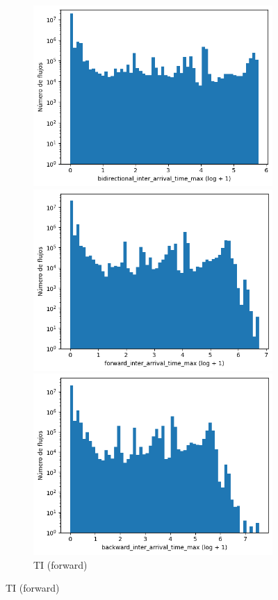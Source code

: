 \begin{figure}[H]
\begin{subfigure}[b]{0.26\textwidth}
        \includegraphics[width=\linewidth]{media/packet_pincer_toniot/bidirectional_inter_arrival_time_max_log_x_log_y.png}
        \caption{TI (bidir.)}
        \includegraphics[width=\textwidth]{media/packet_pincer_toniot/forward_inter_arrival_time_max_log_x_log_y.png}
        \caption{TI (forward)}
        \includegraphics[width=\textwidth]{media/packet_pincer_toniot/backward_inter_arrival_time_max_log_x_log_y.png}

\end{subfigure}
\end{figure}
